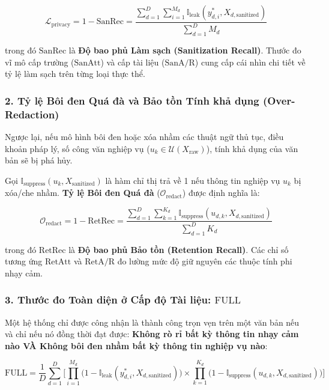 \documentclass[
  11pt,
  a4paper,
]{article}
\providecommand{\texorpdfstring}[2]{#1}
\begin{document}
\[\mathcal{L}_{\text{privacy}} = 1 - \text{SanRec} = \frac{\sum_{d=1}^D \sum_{i=1}^{M_d} \mathbb{I}_{\text{leak}}(y_{d,i}^*, X_{d,\text{sanitized}})}{\sum_{d=1}^D M_d}\]

trong đó \(\text{SanRec}\) là \textbf{Độ bao phủ Làm sạch (Sanitization Recall)}. Thước đo vĩ mô cấp
trường (\(\text{SanAtt}\)) và cấp tài liệu (\(\text{SanA/R}\)) cung cấp cái nhìn chi tiết về tỷ lệ
làm sạch trên từng loại thực thể.

\subsubsection{2. Tỷ lệ Bôi đen Quá đà và Bảo tồn Tính khả dụng
(Over-Redaction)}\label{tux1ef7-lux1ec7-buxf4i-ux111en-quuxe1-ux111uxe0-vuxe0-bux1ea3o-tux1ed3n-tuxednh-khux1ea3-dux1ee5ng-over-redaction}

Ngược lại, nếu mô hình bôi đen hoặc xóa nhầm các thuật ngữ thủ tục, điều khoản pháp lý, số công văn
nghiệp vụ (\(u_k \in \mathcal{U}(X_{\text{raw}})\)), tính khả dụng của văn bản sẽ bị phá hủy.

Gọi \(\mathbb{I}_{\text{suppress}}(u_k, X_{\text{sanitized}})\) là hàm chỉ thị trả về 1 nếu thông
tin nghiệp vụ \(u_k\) bị xóa/che nhầm. \textbf{Tỷ lệ Bôi đen Quá đà}
(\(\mathcal{O}_{\text{redact}}\)) được định nghĩa là:

\[\mathcal{O}_{\text{redact}} = 1 - \text{RetRec} = \frac{\sum_{d=1}^D \sum_{k=1}^{K_d} \mathbb{I}_{\text{suppress}}(u_{d,k}, X_{d,\text{sanitized}})}{\sum_{d=1}^D K_d}\]

trong đó \(\text{RetRec}\) là \textbf{Độ bao phủ Bảo tồn (Retention Recall)}. Các chỉ số tương ứng
\(\text{RetAtt}\) và \(\text{RetA/R}\) đo lường mức độ giữ nguyên các thuộc tính phi nhạy cảm.

\subsubsection{\texorpdfstring{3. Thước đo Toàn diện ở Cấp độ Tài liệu:
\(\text{FULL}\)}{3. Thước đo Toàn diện ở Cấp độ Tài liệu: \textbackslash text\{FULL\}}}\label{thux1b0ux1edbc-ux111o-touxe0n-diux1ec7n-ux1edf-cux1ea5p-ux111ux1ed9-tuxe0i-liux1ec7u-textfull}

Một hệ thống chỉ được công nhận là thành công trọn vẹn trên một văn bản nếu và chỉ nếu nó đồng thời
đạt được: \textbf{Không rò rỉ bất kỳ thông tin nhạy cảm nào VÀ Không bôi đen nhầm bất kỳ thông tin
nghiệp vụ nào}:

\[\text{FULL} = \frac{1}{D} \sum_{d=1}^D \Biggl[ \prod_{i=1}^{M_d} \bigl(1 - \mathbb{I}_{\text{leak}}(y_{d,i}^*, X_{d,\text{sanitized}})\bigr) \times \prod_{k=1}^{K_d} \bigl(1 - \mathbb{I}_{\text{suppress}}(u_{d,k}, X_{d,\text{sanitized}})\bigr) \Biggr]\]
\end{document}
